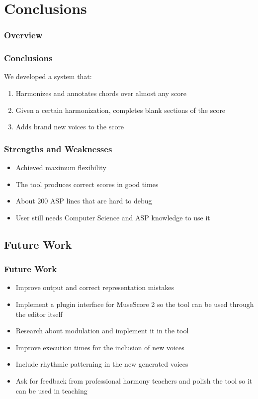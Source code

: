 \documentclass[english,handout]{beamer}
\begin{document}
\section{Conclusions}
\begin{frame}
	\frametitle{Overview}
\end{frame}
		\begin{frame}
			\frametitle{Conclusions}
			We developed a system that:
			\begin{enumerate}
				\item \alert{Harmonizes} and annotates chords over almost any score
				\item Given a certain harmonization, \alert{completes blank sections} of the score
				\item \alert{Adds brand new voices} to the score 
			\end{enumerate}
		\end{frame}
		\begin{frame}
			\frametitle{Strengths and Weaknesses}
			\begin{itemize}
				  \item<pro@1-> Achieved \alert{maximum flexibility}
			      \item<pro@1-> The tool produces correct scores in good times
			      \end{itemize}
			      \begin{itemize}
			      \item<con@1-> About 200 ASP lines that are hard to debug
			      \item<con@1-> User still needs \alert{Computer Science and ASP knowledge} to use it
			    \end{itemize}
		\end{frame}
	
\subsection{Future Work}
	\begin{frame}
		\frametitle{Future Work}
		\begin{itemize}
			\item Improve \alert{output} and correct representation mistakes
			\item Implement a \alert{plugin interface} for MuseScore 2 so the tool can be used through the editor itself
			\item Research about \alert{modulation} and implement it in the tool
			\item Improve execution times for the inclusion of new voices
			\item Include \alert{rhythmic patterning} in the new generated voices
			\item Ask for feedback from professional harmony teachers and polish the tool so it can be used in teaching
		\end{itemize}
	\end{frame}
		
\end{document}
